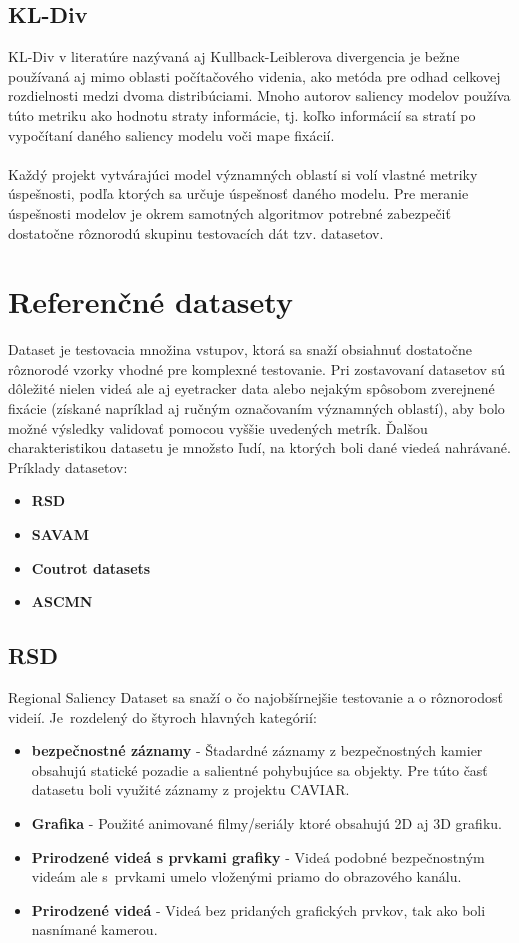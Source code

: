 \subsection{KL-Div}
KL-Div v literatúre nazývaná aj Kullback-Leiblerova divergencia\cite{kldiv} je bežne používaná aj mimo oblasti počítačového videnia, ako metóda pre odhad celkovej rozdielnosti medzi dvoma distribúciami.
Mnoho autorov saliency modelov používa túto metriku ako hodnotu straty informácie, tj. koľko informácií sa stratí po vypočítaní daného saliency modelu voči mape fixácií.
\\\\
Každý projekt vytvárajúci model významných oblastí si volí vlastné metriky úspešnosti, podľa ktorých sa určuje úspešnosť daného modelu.
Pre meranie úspešnosti modelov je okrem samotných algoritmov potrebné zabezpečiť dostatočne rôznorodú skupinu testovacích dát tzv. datasetov.

\section{Referenčné datasety}
Dataset je testovacia množina vstupov, ktorá sa snaží obsiahnuť dostatočne rôznorodé vzorky vhodné pre komplexné testovanie.
Pri zostavovaní datasetov sú dôležité nielen videá ale aj eyetracker data alebo nejakým spôsobom zverejnené fixácie (získané napríklad aj ručným označovaním významných oblastí), aby bolo možné výsledky validovať pomocou vyššie uvedených metrík.
Ďalšou charakteristikou datasetu je množsto ľudí, na ktorých boli dané viedeá nahrávané.
\\ Príklady datasetov:
\begin{itemize}
	\item \textbf{RSD}\cite{rsd}
	\item \textbf{SAVAM}\cite{savam}
	\item \textbf{Coutrot datasets}\cite{coutrot-database}
  \item \textbf{ASCMN}\cite{accv}
\end{itemize}

\subsection{RSD}
Regional Saliency Dataset sa snaží o čo najobšírnejšie testovanie a o rôznorodosť videií.
Je~rozdelený do štyroch hlavných kategórií:
\begin{itemize}
	\item \textbf{bezpečnostné záznamy} - Štadardné záznamy z bezpečnostných kamier obsahujú statické pozadie a salientné pohybujúce sa objekty.
Pre túto časť datasetu boli využité záznamy z projektu CAVIAR\cite{rsd-caviar}.
	\item \textbf{Grafika} - Použité animované filmy/seriály ktoré obsahujú 2D aj 3D grafiku.
  \item \textbf{Prirodzené videá s prvkami grafiky} - Videá podobné bezpečnostným videám ale s~prvkami umelo vloženými priamo do obrazového kanálu.
  \item \textbf{Prirodzené videá} - Videá bez pridaných grafických prvkov, tak ako boli nasnímané kamerou.
\end{itemize}

